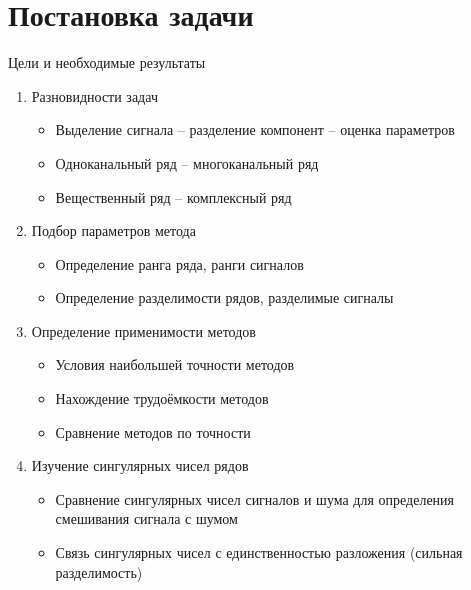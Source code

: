 \documentclass[pdf, unicode, 10pt, notheorems, handout]{beamer}
\begin{document}
\section{Постановка задачи}
\begin{frame}{Цели и необходимые результаты}
  \begin{enumerate}
    \item Разновидности задач
      \begin{itemize}
        \item Выделение сигнала -- разделение компонент -- оценка параметров
        \item Одноканальный ряд -- многоканальный ряд
        \item Вещественный ряд -- комплексный ряд
      \end{itemize}\medskip
    \item Подбор параметров метода
      \begin{itemize}
        \item Определение ранга ряда, ранги сигналов
        \item Определение разделимости рядов, разделимые сигналы
      \end{itemize}\medskip
    \item Определение применимости методов
      \begin{itemize}
        \item Условия наибольшей точности методов
        \item Нахождение трудоёмкости методов
        \item Сравнение методов по точности
      \end{itemize}\medskip
    \item Изучение сингулярных чисел рядов
      \begin{itemize}
        \item Сравнение сингулярных чисел сигналов и шума для
          определения смешивания сигнала с шумом
        \item Связь сингулярных чисел с единственностью разложения
          (сильная разделимость)
      \end{itemize}
  \end{enumerate}
\end{frame}
\end{document}
